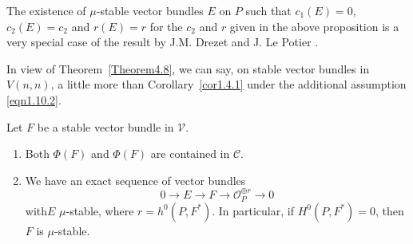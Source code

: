 \begin{Remark}
The existence of $\mu$-stable vector bundles $E$ on $P$ such that
$c_1(E)=0$, $c_2(E)=c_2$ and $r(E)=r$ for the $c_2$ and $r$ given in
the above proposition is a very special case of the result by
J.M. Drezet and J. Le Potier \cite{key6}.

In view of Theorem~\ref{Theorem4.8}, we can say, on stable vector bundles
in $V(n,n)$, a little more than Corollary~\ref{cor1.4.1} under the
additional assumption \eqref{eqn1.10.2}.
\end{Remark}

\begin{Prop}\label{Prop5.5}
Let $F$ be a stable vector bundle in $\mathscr{V}$.
\begin{enumerate}
\renewcommand{\labelenumi}{(\theenumi)}
\item  Both $\Phi(F)$ and $\Phi(F)$ are contained in $\mathscr{C}$. 
\item  We have an exact sequence of vector bundles 
$$
0\to E\to F\to \mathscr{O}^{\oplus r}_P\to 0
$$
with\pageoriginale $E$ $\mu$-stable, where $r=h^{0}(P,F^{\ast})$. In
particular, if $H^{0}(P,F^{\ast})=0$, then $F$ is $\mu$-stable.
\end{enumerate}
\end{Prop}

